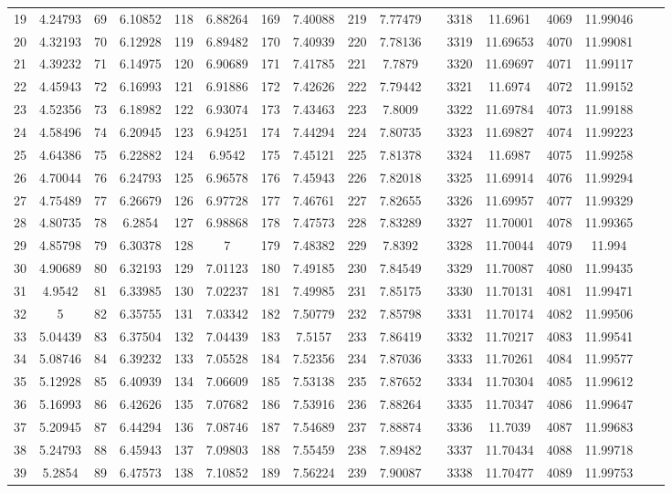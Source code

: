 {\begin{tabular}[h]{|cc|cc|cc|cc|cc|c|cc|cc|cc|}
19&4.24793&69&6.10852&118&6.88264&169&7.40088&219&7.77479& &3318&11.6961&4069&11.99046\\ 
20&4.32193&70&6.12928&119&6.89482&170&7.40939&220&7.78136& &3319&11.69653&4070&11.99081\\ 
21&4.39232&71&6.14975&120&6.90689&171&7.41785&221&7.7879& &3320&11.69697&4071&11.99117\\ 
22&4.45943&72&6.16993&121&6.91886&172&7.42626&222&7.79442& &3321&11.6974&4072&11.99152\\ 
23&4.52356&73&6.18982&122&6.93074&173&7.43463&223&7.8009& &3322&11.69784&4073&11.99188\\ 
24&4.58496&74&6.20945&123&6.94251&174&7.44294&224&7.80735& &3323&11.69827&4074&11.99223\\ 
25&4.64386&75&6.22882&124&6.9542&175&7.45121&225&7.81378& &3324&11.6987&4075&11.99258\\ 
26&4.70044&76&6.24793&125&6.96578&176&7.45943&226&7.82018& &3325&11.69914&4076&11.99294\\ 
27&4.75489&77&6.26679&126&6.97728&177&7.46761&227&7.82655& &3326&11.69957&4077&11.99329\\ 
28&4.80735&78&6.2854&127&6.98868&178&7.47573&228&7.83289& &3327&11.70001&4078&11.99365\\ 
29&4.85798&79&6.30378&128&7&179&7.48382&229&7.8392& &3328&11.70044&4079&11.994\\ 
30&4.90689&80&6.32193&129&7.01123&180&7.49185&230&7.84549& &3329&11.70087&4080&11.99435\\ 
31&4.9542&81&6.33985&130&7.02237&181&7.49985&231&7.85175& &3330&11.70131&4081&11.99471\\ 
32&5&82&6.35755&131&7.03342&182&7.50779&232&7.85798& &3331&11.70174&4082&11.99506\\ 
33&5.04439&83&6.37504&132&7.04439&183&7.5157&233&7.86419& &3332&11.70217&4083&11.99541\\ 
34&5.08746&84&6.39232&133&7.05528&184&7.52356&234&7.87036& &3333&11.70261&4084&11.99577\\ 
35&5.12928&85&6.40939&134&7.06609&185&7.53138&235&7.87652& &3334&11.70304&4085&11.99612\\ 
36&5.16993&86&6.42626&135&7.07682&186&7.53916&236&7.88264& &3335&11.70347&4086&11.99647\\ 
37&5.20945&87&6.44294&136&7.08746&187&7.54689&237&7.88874& &3336&11.7039&4087&11.99683\\ 
38&5.24793&88&6.45943&137&7.09803&188&7.55459&238&7.89482& &3337&11.70434&4088&11.99718\\ 
39&5.2854&89&6.47573&138&7.10852&189&7.56224&239&7.90087& &3338&11.70477&4089&11.99753\\ 

\end{tabular}}
